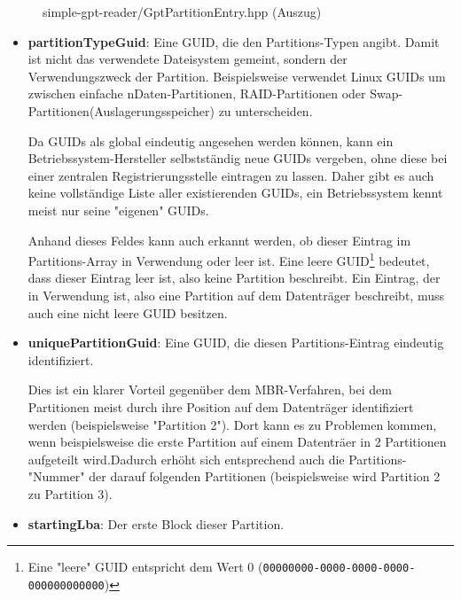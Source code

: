 \begin{figure}[ht]
    \inputminted[baselinestretch=1.2, linenos, tabsize=4, breaklines, frame=single]{c++}{content/code/simple-gpt-reader/GptPartitionEntry.hpp}
    
    \caption{simple-gpt-reader/GptPartitionEntry.hpp (Auszug)}
    \label{fig:GptPartitionEntry.hpp}
\end{figure}

\begin{itemize}
    \item \textbf{partitionTypeGuid}:
    Eine GUID, die den Partitions-Typen angibt.
    Damit ist nicht das verwendete Dateisystem gemeint, sondern der Verwendungszweck der Partition.
    Beispielsweise verwendet Linux GUIDs um zwischen einfache nDaten-Partitionen, RAID-Partitionen oder Swap-Partitionen(Auslagerungsspeicher) zu unterscheiden.
    
    Da GUIDs als global eindeutig angesehen werden können, kann ein Betriebssystem-Hersteller selbstständig neue GUIDs vergeben, ohne diese bei einer zentralen Registrierungsstelle eintragen zu lassen.
    Daher gibt es auch keine vollständige Liste aller existierenden GUIDs, ein Betriebssystem kennt meist nur seine "eigenen" GUIDs.

    Anhand dieses Feldes kann auch erkannt werden, ob dieser Eintrag im Partitions-Array in Verwendung oder leer ist.
    Eine leere GUID\footnote{
        Eine "leere" GUID entspricht dem Wert 0 (\texttt{00000000-0000-0000-0000-000000000000})
    } bedeutet, dass dieser Eintrag leer ist, also keine Partition beschreibt.
    Ein Eintrag, der in Verwendung ist, also eine Partition auf dem Datenträger beschreibt, muss auch eine nicht leere GUID besitzen.

    \item \textbf{uniquePartitionGuid}:
    Eine GUID, die diesen Partitions-Eintrag eindeutig identifiziert.
    
    Dies ist ein klarer Vorteil gegenüber dem MBR-Verfahren, bei dem Partitionen meist durch ihre Position auf dem Datenträger identifiziert werden (beispielsweise "Partition 2").
    Dort kann es zu Problemen kommen, wenn beispielsweise die erste Partition auf einem Datenträer in 2 Partitionen aufgeteilt wird.Dadurch erhöht sich entsprechend auch die Partitions-"Nummer" der darauf folgenden Partitionen (beispielsweise wird Partition 2 zu Partition 3).

    \item \textbf{startingLba}:
    Der erste Block dieser Partition.


\end{itemize}
